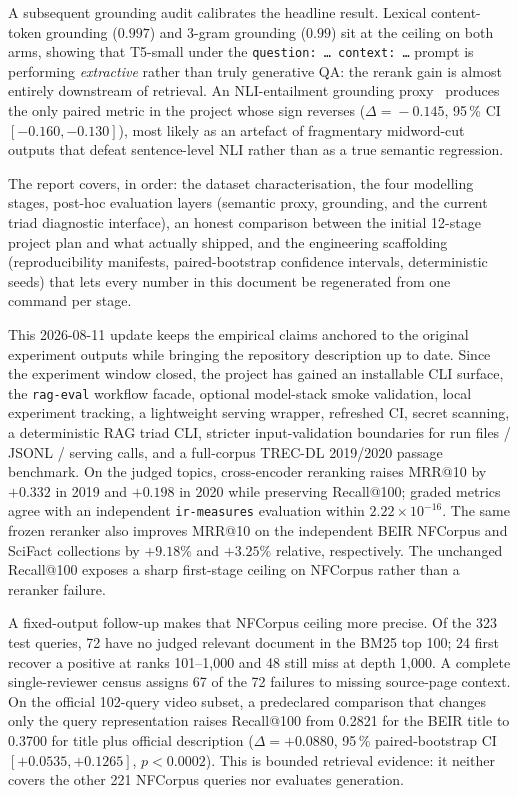 \documentclass[11pt,a4paper]{article}
\makeatletter
\newcommand{\recallH}{Recall@100}
\newcommand{\bmtwofive}{BM25}
\makeatother
\begin{document}
A subsequent grounding audit calibrates the headline result.  Lexical
content-token grounding ($0.997$) and 3-gram grounding ($0.99$) sit
at the ceiling on both arms, showing that T5-small under the
\texttt{question: \ldots\ context: \ldots} prompt is performing
\emph{extractive} rather than truly generative QA: the rerank gain is
almost entirely downstream of retrieval.  An NLI-entailment grounding
proxy~\cite{he2023debertav3,williams2018mnli} produces the only
paired metric in the project whose sign reverses ($\Delta\!=\!-0.145$,
95\,\% CI $[-0.160,-0.130]$), most likely as an artefact of
fragmentary midword-cut outputs that defeat sentence-level NLI rather
than as a true semantic regression.

The report covers, in order: the dataset characterisation, the four
modelling stages, post-hoc evaluation layers (semantic proxy,
grounding, and the current triad diagnostic interface), an honest
comparison between the initial 12-stage
project plan and what actually shipped, and the engineering
scaffolding (reproducibility manifests, paired-bootstrap confidence
intervals, deterministic seeds) that lets every number in this
document be regenerated from one command per stage.

This 2026-08-11 update keeps the empirical claims anchored to the
original experiment outputs while bringing the repository description
up to date.  Since the experiment window closed, the project has
gained an installable CLI surface, the \texttt{rag-eval} workflow
facade, optional model-stack smoke validation, local experiment
tracking, a lightweight serving wrapper, refreshed CI, secret
scanning, a deterministic RAG triad CLI, stricter input-validation
boundaries for run files / JSONL / serving calls, and a full-corpus
TREC-DL 2019/2020 passage benchmark.  On the judged topics,
cross-encoder reranking raises MRR@10 by $+0.332$ in 2019 and
$+0.198$ in 2020 while preserving Recall@100; graded metrics agree
with an independent \texttt{ir-measures} evaluation within
$2.22\!\times\!10^{-16}$.  The same frozen reranker also improves
MRR@10 on the independent BEIR NFCorpus and SciFact collections by
$+9.18\%$ and $+3.25\%$ relative, respectively.  The unchanged
Recall@100 exposes a sharp first-stage ceiling on NFCorpus rather
than a reranker failure.

A fixed-output follow-up makes that NFCorpus ceiling more precise.
Of the 323 test queries, 72 have no judged relevant document in the
\bmtwofive{} top 100; 24 first recover a positive at ranks 101--1,000
and 48 still miss at depth 1,000.  A complete single-reviewer census
assigns 67 of the 72 failures to missing source-page context.  On the
official 102-query video subset, a predeclared comparison that changes
only the query representation raises \recallH{} from 0.2821 for the
BEIR title to 0.3700 for title plus official description
($\Delta=+0.0880$, 95\,\% paired-bootstrap CI
$[+0.0535,+0.1265]$, $p<0.0002$).  This is bounded retrieval evidence:
it neither covers the other 221 NFCorpus queries nor evaluates
generation.
\end{document}
